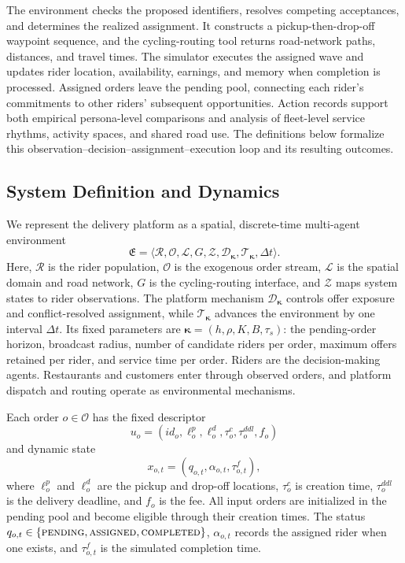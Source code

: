 \documentclass[letterpaper,journal]{IEEEtran}
\begin{document}
The environment checks the proposed identifiers, resolves competing acceptances, and determines the realized assignment. It constructs a pickup-then-drop-off waypoint sequence, and the cycling-routing tool returns road-network paths, distances, and travel times. The simulator executes the assigned wave and updates rider location, availability, earnings, and memory when completion is processed. Assigned orders leave the pending pool, connecting each rider's commitments to other riders' subsequent opportunities. Action records support both empirical persona-level comparisons and analysis of fleet-level service rhythms, activity spaces, and shared road use. The definitions below formalize this observation--decision--assignment--execution loop and its resulting outcomes.

\subsection{System Definition and Dynamics}
We represent the delivery platform as a spatial, discrete-time multi-agent environment
\begin{equation}
\mathfrak{E}=\langle\mathcal{R},\mathcal{O},\mathcal{L},G,
\mathcal{Z},
\mathcal{D}_{\boldsymbol{\kappa}},
\mathcal{T}_{\boldsymbol{\kappa}},\Delta t\rangle .
\end{equation}
Here, $\mathcal{R}$ is the rider population, $\mathcal{O}$ is the exogenous order stream, $\mathcal{L}$ is the spatial domain and road network, $G$ is the cycling-routing interface, and $\mathcal{Z}$ maps system states to rider observations. The platform mechanism $\mathcal{D}_{\boldsymbol{\kappa}}$ controls offer exposure and conflict-resolved assignment, while $\mathcal{T}_{\boldsymbol{\kappa}}$ advances the environment by one interval $\Delta t$. Its fixed parameters are $\boldsymbol{\kappa}=(h,\rho,K,B,\tau_s)$: the pending-order horizon, broadcast radius, number of candidate riders per order, maximum offers retained per rider, and service time per order. Riders are the decision-making agents. Restaurants and customers enter through observed orders, and platform dispatch and routing operate as environmental mechanisms.

Each order $o\in\mathcal{O}$ has the fixed descriptor
\begin{equation}
u_o=(id_o,\ell_o^{p},\ell_o^{d},
\tau_o^{c},\tau_o^{ddl},f_o)
\end{equation}
and dynamic state
\begin{equation}
x_{o,t}=(q_{o,t},\alpha_{o,t},\tau_{o,t}^{f}),
\end{equation}
where $\ell_o^{p}$ and $\ell_o^{d}$ are the pickup and drop-off locations, $\tau_o^{c}$ is creation time, $\tau_o^{ddl}$ is the delivery deadline, and $f_o$ is the fee. All input orders are initialized in the pending pool and become eligible through their creation times. The status $q_{o,t}\in\{\textsc{pending},\textsc{assigned},\textsc{completed}\}$, $\alpha_{o,t}$ records the assigned rider when one exists, and $\tau_{o,t}^{f}$ is the simulated completion time.
\end{document}
